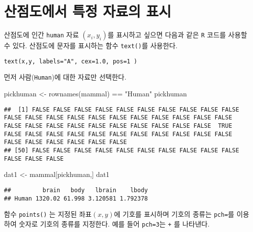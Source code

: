 \documentclass[
]{book}
\newenvironment{Shaded}{\begin{snugshade}}{\end{snugshade}}
\newcommand{\FunctionTok}[1]{\textcolor[rgb]{0.00,0.00,0.00}{#1}}
\newcommand{\NormalTok}[1]{#1}
\newcommand{\OtherTok}[1]{\textcolor[rgb]{0.56,0.35,0.01}{#1}}
\newcommand{\SpecialCharTok}[1]{\textcolor[rgb]{0.00,0.00,0.00}{#1}}
\newcommand{\StringTok}[1]{\textcolor[rgb]{0.31,0.60,0.02}{#1}}
\begin{document}
\hypertarget{uxc0b0uxc810uxb3c4uxc5d0uxc11c-uxd2b9uxc815-uxc790uxb8ccuxc758-uxd45cuxc2dc}{%
\section{산점도에서 특정 자료의 표시}\label{uxc0b0uxc810uxb3c4uxc5d0uxc11c-uxd2b9uxc815-uxc790uxb8ccuxc758-uxd45cuxc2dc}}

산점도에 인간 \texttt{human} 자료 \((x_i, y_i)\)를 표시하고 싶으면 다음과 같은 \texttt{R} 코드를 사용할 수 있다. 산점도에 문자를 표시하는 함수 \texttt{text()}를 사용한다.

\begin{verbatim}
text(x,y, labels="A", cex=1.0, pos=1 )
\end{verbatim}

먼저 사람(\texttt{Human})에 대한 자료만 선택한다.

\begin{Shaded}
\begin{Highlighting}[]
\NormalTok{pickhuman }\OtherTok{\textless{}{-}} \FunctionTok{rownames}\NormalTok{(mammal) }\SpecialCharTok{==} \StringTok{"Human"}  
\NormalTok{pickhuman}
\end{Highlighting}
\end{Shaded}

\begin{verbatim}
##  [1] FALSE FALSE FALSE FALSE FALSE FALSE FALSE FALSE FALSE FALSE FALSE FALSE FALSE FALSE FALSE FALSE FALSE FALSE FALSE FALSE FALSE FALSE FALSE FALSE FALSE FALSE FALSE FALSE FALSE FALSE FALSE  TRUE FALSE FALSE FALSE FALSE FALSE FALSE FALSE FALSE FALSE FALSE FALSE FALSE FALSE FALSE FALSE FALSE FALSE
## [50] FALSE FALSE FALSE FALSE FALSE FALSE FALSE FALSE FALSE FALSE FALSE FALSE FALSE
\end{verbatim}

\begin{Shaded}
\begin{Highlighting}[]
\NormalTok{dat1 }\OtherTok{\textless{}{-}}\NormalTok{ mammal[pickhuman,]}
\NormalTok{dat1}
\end{Highlighting}
\end{Shaded}

\begin{verbatim}
##         brain   body   lbrain    lbody
## Human 1320.02 61.998 3.120581 1.792378
\end{verbatim}

함수 \texttt{points()} 는 지정된 좌표\((x,y)\)에 기호를 표시하며 기호의 종류는 \texttt{pch=}를 이용하여 숫자로 기호의 종류를 지정한다. 예를 들어 \texttt{pch=3}는 \texttt{+} 를 나타낸다.
\end{document}
